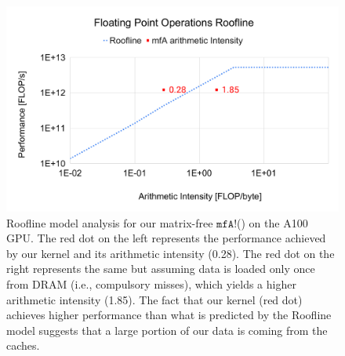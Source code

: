 \begin{figure}
    \centering
    \includegraphics[width=\linewidth]{figures/Floating_Point_Operations_Roofline_Theoretical.pdf}
    \caption{
    Roofline model analysis for our matrix-free $\texttt{mfA!}$() on the A100 GPU.
    The red dot on the left represents the performance achieved by our kernel and its arithmetic intensity (0.28).
    The red dot on the right represents the same but assuming data is loaded only once from DRAM (i.e., compulsory misses), which yields a higher arithmetic intensity (1.85).
    The fact that our kernel (red dot) achieves higher performance than what is predicted by the Roofline model suggests that a large portion of our data is coming from the caches.
    }
    \label{fig:roofline}
\end{figure}

